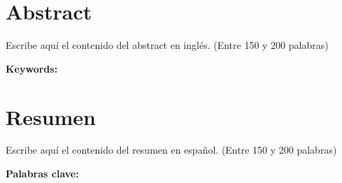   \clearpage
  \chapter*{Abstract}

  
  Escribe aquí el contenido del abstract en inglés. (Entre 150 y 200 palabras)

  \vspace{1cm}
  \textbf{Keywords:} %


  \clearpage
  \chapter*{Resumen}
  Escribe aquí el contenido del resumen en español. (Entre 150 y 200 palabras)

  \vspace{1cm}
  \textbf{Palabras clave:} %
  